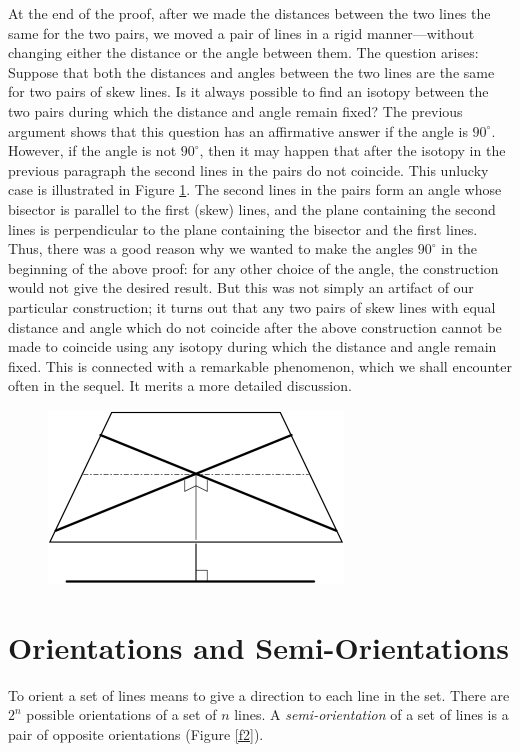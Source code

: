 \documentclass{article}
\begin{document}
At the end of the proof, after we made the distances between the two lines the
same for the two pairs, we moved a pair of lines in a rigid manner---without
changing either the distance or the angle between them. The question arises:
Suppose that both the distances and angles between the two lines are the same
for two pairs of skew lines. Is it always possible to find an isotopy between
the two pairs during which the distance and angle remain fixed? The previous
argument shows that this question has an affirmative answer if the angle is
$90^\circ$. However, if the angle is not $90^\circ$, then it may happen that
after the isotopy in the previous paragraph the second lines in the pairs do
not coincide. This unlucky
 case is illustrated in Figure \ref{f1}. The second lines in
the pairs form an angle whose bisector is parallel to the first (skew) lines,
and the plane containing the second lines is perpendicular to the plane
containing the bisector and the first lines. Thus, there was a good reason why
we wanted to make the angles $90^\circ$ in the beginning of the above proof:
for any other choice of the angle, the construction would not give the desired
result. But this was not simply an artifact of our particular construction; it
turns out that any two pairs of skew lines with equal distance and angle which
do not coincide after the above construction cannot be made to coincide using
any isotopy during which the distance and angle remain fixed. This is connected
with a remarkable phenomenon, which we shall encounter often in the sequel. It
merits a more detailed discussion.

\begin{figure}
{\includegraphics{imagesSkewlines/x1.png}}
\caption{}
\label{f1}
\end{figure}


\section{Orientations and Semi-Orientations}

To orient a set of lines means to give a direction to each line in the set. There
are $2^n$ possible orientations of a set of $n$ lines. A {\em
semi-orientation\/} of a set of lines is a pair of opposite orientations (Figure
\ref{f2}).
\end{document}
